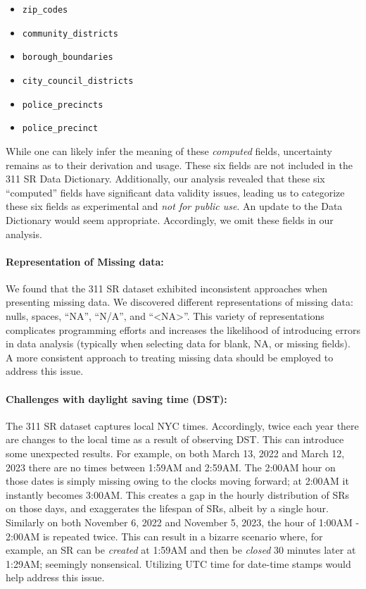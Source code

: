 \documentclass[linenumber]{jdsart}
\begin{document}
\begin{itemize}[left=1.5em]
    \item \texttt{zip\_codes}
    \item \texttt{community\_districts}
    \item \texttt{borough\_boundaries}
    \item \texttt{city\_council\_districts}
    \item \texttt{police\_precincts}
    \item \texttt{police\_precinct}
\end{itemize}

While one can likely infer the meaning of these \textit{computed} 
fields, uncertainty remains as to their derivation and 
usage. These six fields are not included in
the 311 SR Data Dictionary. Additionally, our analysis 
revealed that these six ``computed'' fields have 
significant data validity issues, leading us to categorize these six fields 
as experimental and \textit{not for public use}. An update 
to the Data Dictionary would seem appropriate. Accordingly, 
we omit these fields in our analysis. 

\paragraph{Representation of Missing data:} We found that the 
311 SR dataset exhibited inconsistent approaches when 
presenting missing data. We discovered different 
representations of missing data: nulls, spaces, ``NA'', ``N/A'', 
and ``<NA>''. This variety of representations complicates programming
efforts and increases the likelihood of introducing errors 
in data analysis (typically when selecting data for blank, NA, or missing fields). A more consistent 
approach to treating missing data should be employed to address this issue.

\paragraph{Challenges with daylight saving time (DST):} The 311 SR 
dataset captures local NYC times. Accordingly, twice each 
year there are changes to the local time as a result of observing 
DST. This can introduce some unexpected results. For example, 
on both March 13, 2022 and March 12, 2023 there are no times 
between 1:59AM and 2:59AM. The 2:00AM hour on those dates 
is simply missing owing to the clocks moving forward; at 2:00AM 
it instantly becomes 3:00AM. This creates a gap in the hourly 
distribution of SRs on those days, and exaggerates the 
lifespan of SRs, albeit by a single hour. Similarly on both
November 6, 2022 and November 5, 2023, the 
hour of 1:00AM - 2:00AM is repeated twice. This can result 
in a bizarre scenario where, for example, an SR can 
be \textit{created} at 1:59AM and then be \textit{closed} 30 minutes later 
at 1:29AM; seemingly nonsensical. Utilizing UTC time 
for date-time stamps would help address this issue.
\end{document}
